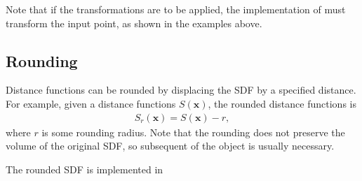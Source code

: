 \documentclass[letterpaper,10pt,english]{sphinxmanual}
\begin{document}
\sphinxAtStartPar
Note that if the transformations are to be applied, the implementation of  must transform the input point, as shown in the examples above.


\subsection{Rounding}
\label{\detokenize{ImplemSDF:rounding}}
\sphinxAtStartPar
Distance functions can be rounded by displacing the SDF by a specified distance.
For example, given a distance functions \(S\left(\mathbf{x}\right)\), the rounded distance functions is
\begin{equation*}
\begin{split}S_r\left(\mathbf{x}\right) = S\left(\mathbf{x}\right) - r,\end{split}
\end{equation*}
\sphinxAtStartPar
where \(r\) is some rounding radius.
Note that the rounding does not preserve the volume of the original SDF, so subsequent  of the object is usually necessary.

\sphinxAtStartPar
The rounded SDF is implemented in 
\end{document}

